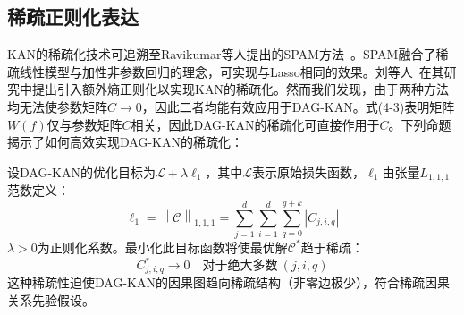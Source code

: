 \subsection{稀疏正则化表达}
KAN的稀疏化技术可追溯至Ravikumar等人提出的SPAM方法~\cite{Ravikumar2009}。SPAM融合了稀疏线性模型与加性非参数回归的理念，可实现与Lasso相同的效果。刘等人~\cite{Ziming2025}在其研究中提出引入额外熵正则化以实现KAN的稀疏化。然而我们发现，由于两种方法均无法使参数矩阵$C\rightarrow 0$，因此二者均能有效应用于DAG-KAN。式(4-3)表明矩阵$W\left( f \right) $仅与参数矩阵$C$相关，因此DAG-KAN的稀疏化可直接作用于$C$。下列命题揭示了如何高效实现DAG-KAN的稀疏化：
\begin{theorem}
	\label{proposition3}
	设DAG-KAN的优化目标为$\mathcal{L} + \lambda \ell_1$，其中$\mathcal{L}$表示原始损失函数，$\ell_1$由张量$L_{1,1,1}$范数定义：
	\begin{equation}
		\ell_1 = \left\| \mathcal{C} \right\| _{1,1,1} = \sum_{j=1}^d \sum_{i=1}^d \sum_{q=0}^{g+k} |C_{j,i,q}| \label{eq4-4}
	\end{equation}
	$\lambda > 0$为正则化系数。最小化此目标函数将使最优解$\mathcal{C}^*$趋于稀疏：
	\begin{equation}
		C_{j,i,q}^* \rightarrow 0 \quad \text{对于绝大多数} \ (j,i,q)
	\end{equation}
	这种稀疏性迫使DAG-KAN的因果图趋向稀疏结构（非零边极少），符合稀疏因果关系先验假设。
\end{theorem}

